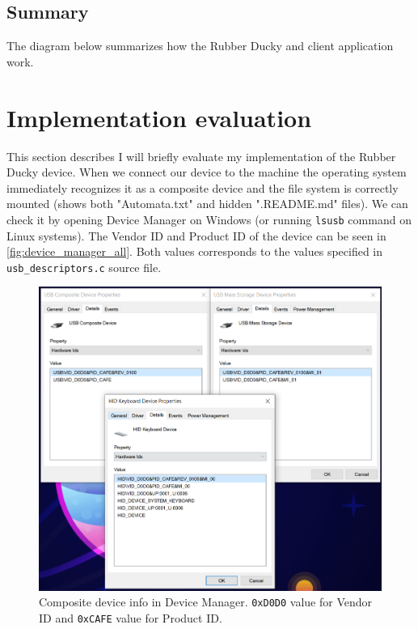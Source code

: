 \section{Summary}
The diagram below  summarizes how the Rubber Ducky and client application work.

\chapter{Implementation evaluation}
\label{capabilities}
This section describes I will briefly evaluate my implementation of the Rubber Ducky device. When we connect our device to the machine the operating system immediately recognizes it as a composite device and the file system is correctly mounted (shows both "Automata.txt" and hidden ".README.md" files). We can check it by opening Device Manager on Windows (or running \verb|lsusb| command on Linux systems). The Vendor ID and Product ID of the device can be seen in \autoref{fig:device_manager_all}. Both values corresponds to the values specified in \verb|usb_descriptors.c| source file.
\begin{figure}[ht]
    \centering
    \includegraphics[width=0.75\linewidth]{./obrazky-figures/device_manager_all.png}
    \caption{Composite device info in Device Manager. \texttt{0xD0D0} value for Vendor ID and \texttt{0xCAFE} value for Product ID.}
    \label{fig:device_manager_all}
\end{figure}

